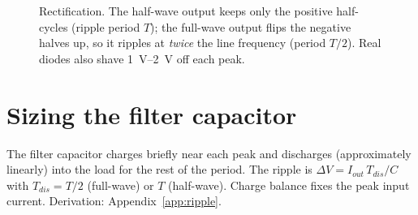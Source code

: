 \documentclass[11pt,a4paper,oneside]{book}
\begin{document}
\begin{figure}[h]\centering
{}
\caption{Rectification. The half-wave output keeps only the positive half-cycles
(ripple period $T$); the full-wave output flips the negative halves up, so it
ripples at \emph{twice} the line frequency (period $T/2$). Real diodes also shave
\qtyrange{1}{2}{\volt} off each peak.}
\label{fig:rectwave}
\end{figure}

\section{Sizing the filter capacitor}
The filter capacitor charges briefly near each peak and discharges (approximately
linearly) into the load for the rest of the period. The ripple is
$\Delta V=I_{out}\,T_{dis}/C$ with $T_{dis}=T/2$ (full-wave) or $T$ (half-wave).
Charge balance fixes the peak input current. Derivation: Appendix~\ref{app:ripple}.
\end{document}
